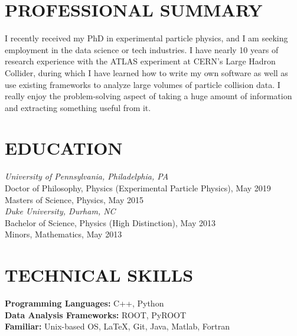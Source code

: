 \documentclass{res}
\begin{document}
\begin{resume}

 

\section{PROFESSIONAL SUMMARY}
    I recently received my PhD in experimental particle physics, and I am seeking employment in the data science or tech industries.
    I have nearly 10 years of research experience with the ATLAS experiment at CERN's Large Hadron Collider, during which I have learned how to write my own software as well as use existing frameworks to analyze large volumes of particle collision data.
    I really enjoy the problem-solving aspect of taking a huge amount of information and extracting something useful from it.

\section{EDUCATION}          
    {\it University of Pennsylvania, Philadelphia, PA} \\
    Doctor of Philosophy, Physics (Experimental Particle Physics), May 2019 \\
    Masters of Science, Physics, May 2015 \\
    \newline
    {\it Duke University, Durham, NC} \\        
    Bachelor of Science, Physics (High Distinction), May 2013   \\       
    Minors, Mathematics, May 2013 

\section{TECHNICAL SKILLS}
    {\bf Programming Languages:} C++, Python\\
    {\bf Data Analysis Frameworks:} ROOT, PyROOT\\
    {\bf Familiar:} Unix-based OS, \LaTeX, Git, Java, Matlab, Fortran


\end{resume}
\end{document}
